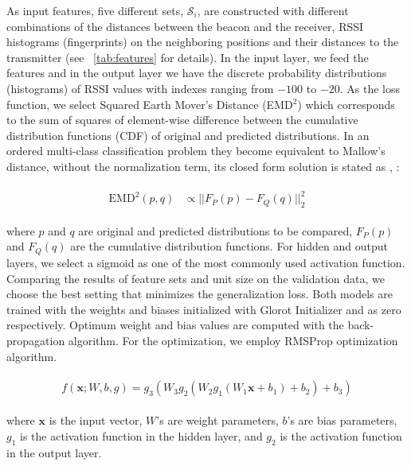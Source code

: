 \documentclass[conference]{IEEEtran}
\newcommand{\x}{\mathbf{x}}
\begin{document}
{	As input features, five different sets, $\mathcal{S}_i$, are constructed with different combinations of the distances between the beacon and the receiver, RSSI histograms (fingerprints) on the neighboring positions and their distances to the transmitter (see \tablename{~\ref{tab:features}} for details). In the input layer, we feed the features and in the output layer we have the discrete probability distributions (histograms) of RSSI values with indexes ranging from $-100$ to $-20$. 
	As the loss function, we select Squared Earth Mover's Distance (EMD$^2$)\cite{Rub2000} which corresponds to the sum of squares of element-wise difference between the cumulative distribution functions (CDF) of original and predicted distributions. In an ordered multi-class classification problem they become equivalent to Mallow's distance, without the normalization term, its closed form solution is stated as \cite{conf/iccv/LevinaB01}, \cite{Hou2016}:
	\begin{small}
		\begin{align}
		\begin{split}
		\text{EMD}^2(p, q) &\propto || F_P(p) - F_Q(q)||^2_2 \end{split}
		\end{align}
	\end{small}
	where $p$ and $q$ are original and predicted distributions to be compared, $F_P(p)$ and $F_Q(q)$ are the cumulative distribution functions. For hidden and output layers, we select a sigmoid as one of the most commonly used activation function. Comparing the results of feature sets and unit size on the validation data, we choose the best setting that minimizes the generalization loss. Both models are trained with the weights and biases initialized with Glorot Initializer \cite{Glo2010} and as zero respectively. Optimum weight and bias values are computed with the back-propagation algorithm. For the optimization, we employ RMSProp optimization algorithm. \cite{Good2016}
	\begin{small}
		\begin{align}
		\begin{split}
		f(\x; W, b, g) = g_3(W_3 g_2(W_2 g_1(W_1 \x + b_1) + b_2) + b_3)
		\end{split}
		\label{eq:model}
		\end{align}
	\end{small}
	where $\x$ is the input vector, $W$'s are weight parameters, $b$'s are bias parameters, $g_1$ is the activation function in the hidden layer, and $g_2$ is the activation function in the output layer.
}
\end{document}
